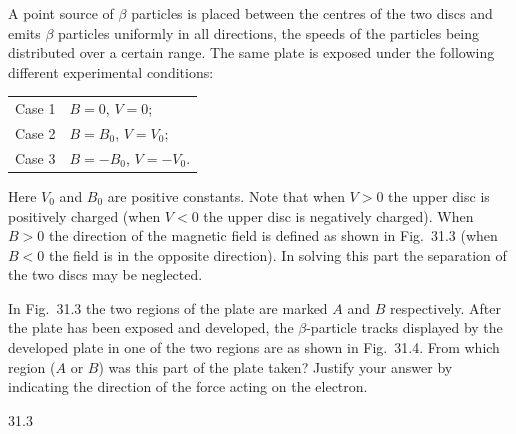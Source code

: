 A point source of $\beta$ particles is placed between the centres of the two discs and emits $\beta$ particles uniformly in all directions, the speeds of the particles being distributed over a certain range. The same plate is exposed under the following different experimental conditions:

\begin{center}
\begin{tabular}{ll}
Case 1 & $B=0$, $V=0$;\\
Case 2 & $B=B_0$, $V=V_0$;\\
Case 3 & $B=-B_0$, $V=-V_0$.
\end{tabular}
\end{center}

Here $V_0$ and $B_0$ are positive constants. Note that when $V>0$ the upper disc is positively charged (when $V<0$ the upper disc is negatively charged). When $B>0$ the direction of the magnetic field is defined as shown in Fig.~31.3 (when $B<0$ the field is in the opposite direction). In solving this part the separation of the two discs may be neglected.

In Fig.~31.3 the two regions of the plate are marked $A$ and $B$ respectively. After the plate has been exposed and developed, the $\beta$-particle tracks displayed by the developed plate in one of the two regions are as shown in Fig.~31.4. From which region ($A$ or $B$) was this part of the plate taken? Justify your answer by indicating the direction of the force acting on the electron.

\begin{figbox}{31.3}
\end{figbox}


